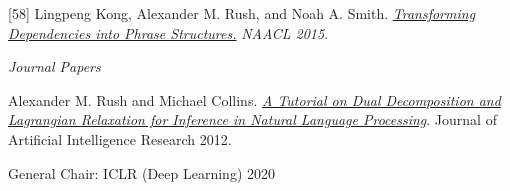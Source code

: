 \documentclass[10pt]{article}
\begin{document}
\medskip


[58] \ind Lingpeng Kong, Alexander M. Rush, and Noah A. Smith. \emph{\href{ http://people.seas.harvard.edu/~srush/naacl15.pdf }{ Transforming Dependencies into Phrase Structures.} }\emph{ NAACL 2015. }

\medskip





\vspace{0.3in}

\noindent\emph{Journal Papers \vspace{0.01in}}

\ind Alexander M. Rush and Michael Collins. \emph{\href{http://www.cs.columbia.edu/~mcollins/acltutorial.pdf}{A Tutorial on Dual Decomposition and Lagrangian Relaxation for Inference in Natural Language Processing}}. Journal of Artificial Intelligence Research 2012.









\medskip


\bigskip

\ind General  Chair:
\ind ICLR (Deep Learning) 2020
\end{document}
